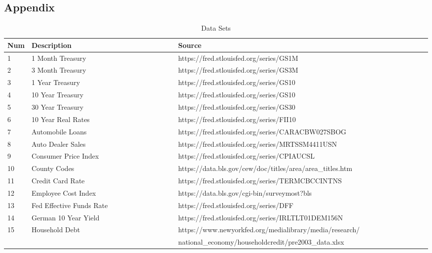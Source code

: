 \documentclass[sigconf,nonacm,11pt]{acmart}
\begin{document}



\appendix
\begin{appendix}

\section{Appendix}
\label{appendix:datasets}




\begin{table}[ht]
\caption{Data Sets}
\centering
\begin{tabular}{p{0.05\linewidth}p{0.35\linewidth}p{0.6\linewidth}}
\hline
Num & Description & Source\\
\hline
1 & 1 Month Treasury & https://fred.stlouisfed.org/series/GS1M\\
2 & 3 Month Treasury & https://fred.stlouisfed.org/series/GS3M\\
3 & 1 Year Treasury & https://fred.stlouisfed.org/series/GS10\\
4 & 10 Year Treasury & https://fred.stlouisfed.org/series/GS10\\
5 & 30 Year Treasury & https://fred.stlouisfed.org/series/GS30\\
6 & 10 Year Real Rates & https://fred.stlouisfed.org/series/FII10\\
7 & Automobile Loans & https://fred.stlouisfed.org/series/CARACBW027SBOG\\
8 & Auto Dealer Sales & https://fred.stlouisfed.org/series/MRTSSM4411USN\\
9 & Consumer Price Index & https://fred.stlouisfed.org/series/CPIAUCSL\\
10 & County Codes & https://data.bls.gov/cew/doc/titles/area/area_titles.htm\\
11 & Credit Card Rate & https://fred.stlouisfed.org/series/TERMCBCCINTNS\\
12 & Employee Cost Index & https://data.bls.gov/cgi-bin/surveymost?bls\\
13 & Fed Effective Funds Rate  & https://fred.stlouisfed.org/series/DFF\\
14 & German 10 Year Yield & https://fred.stlouisfed.org/series/IRLTLT01DEM156N\\
15 & Household Debt & https://www.newyorkfed.org/medialibrary/media/research/\\
 & & national\_economy/householdcredit/pre2003\_data.xlsx\\ 

\end{tabular}
\end{table}
\end{appendix}
\end{document}
